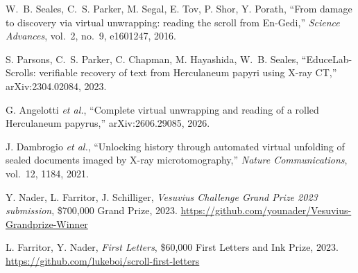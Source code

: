 %
%
%


 W.~B. Seales, C.~S. Parker, M. Segal, E. Tov, P. Shor, Y. Porath,
  ``From damage to discovery via virtual unwrapping: reading the scroll from En-Gedi,''
  \emph{Science Advances}, vol.~2, no.~9, e1601247, 2016.

 S. Parsons, C.~S. Parker, C. Chapman, M. Hayashida, W.~B. Seales,
  ``EduceLab-Scrolls: verifiable recovery of text from Herculaneum papyri using X-ray CT,''
  arXiv:2304.02084, 2023.

 G. Angelotti \emph{et al.}, ``Complete virtual unwrapping and reading
  of a rolled Herculaneum papyrus,'' arXiv:2606.29085, 2026.

 J. Dambrogio \emph{et al.}, ``Unlocking history through automated
  virtual unfolding of sealed documents imaged by X-ray microtomography,''
  \emph{Nature Communications}, vol.~12, 1184, 2021.


 Y. Nader, L. Farritor, J. Schilliger, \emph{Vesuvius Challenge Grand Prize
  2023 submission}, \$700{,}000 Grand Prize, 2023.
  \url{https://github.com/younader/Vesuvius-Grandprize-Winner}

 L. Farritor, Y. Nader, \emph{First Letters}, \$60{,}000 First Letters
  and Ink Prize, 2023. \url{https://github.com/lukeboi/scroll-first-letters}

